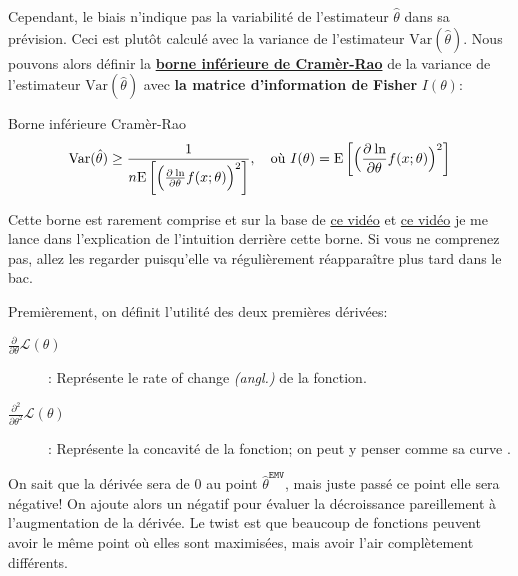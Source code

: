 \documentclass[10pt, french]{article}
\begin{document}
\begin{multicols*}{2}
Cependant, le biais n'indique pas la variabilité de l'estimateur $\hat\theta$ dans sa prévision. Ceci est plutôt calculé avec la variance de l'estimateur $\text{Var}(\hat{\theta})$. 
Nous pouvons alors définir la \hyperlink{cramer-rao}{\textbf{borne inférieure de Cramèr-Rao}} de la variance de l'estimateur $\text{Var}(\hat{\theta})$ avec \textbf{la matrice d'information de Fisher} $I(\theta)$:

\begin{algo}{\hypertarget{cramer-rao}{Borne inférieure Cramèr-Rao}}
\begin{align*}
	\text{Var}(\hat{\theta}) \ge \frac{1}{n\text{E}\left[\Big(\deriv{\theta}\ln f(x ; \theta)\Big)^{2}\right]}, \quad \text{où } I(\theta) = \text{E}\left[\Big(\deriv{\theta}\ln f(x ; \theta)\Big)^{2}\right]
\end{align*}
\end{algo}

Cette borne est rarement comprise et sur la base de \hyperlink{https://www.youtube.com/watch?v=igQIsYAlKlY}{ce vidéo} et \hyperlink{https://www.youtube.com/watch?v=i0JiSddCXMM}{ce vidéo} je me lance dans l'explication de l'intuition derrière cette borne. Si vous ne comprenez pas, allez les regarder puisqu'elle va régulièrement réapparaître plus tard dans le bac.

Premièrement, on définit l'utilité des deux premières dérivées:
\begin{description}
	\item[$\frac{\partial}{\partial\theta} \mathcal{L}(\theta)$]: Représente le \og rate of change \fg{} \textit{(angl.)} de la fonction.
	\item[$\frac{\partial^{2}}{\partial\theta^{2}} \mathcal{L}(\theta)$]: Représente la concavité de la fonction; on peut y penser comme sa \og curve \fg{}.
\end{description}

On sait que la dérivée sera de 0 au point $\hat\theta^{\texttt{EMV}}$, mais juste passé ce point elle sera négative! On ajoute alors un négatif pour évaluer la décroissance pareillement à l'augmentation de la dérivée. Le twist est que beaucoup de fonctions peuvent avoir le même point où elles sont maximisées, mais avoir l'air complètement différents. 


\begin{tikzpicture}[x=0.75pt,y=0.75pt,yscale=-1,xscale=1]


\end{tikzpicture}
\end{multicols*}
\end{document}

